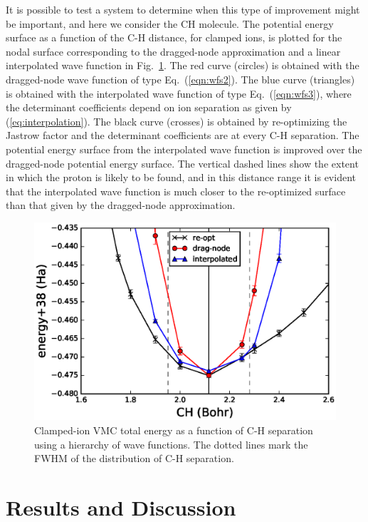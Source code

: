 \documentclass[aip,jcp,numerical,reprint]{revtex4-1}
\begin{document}
It is possible to test a system to determine when this type of improvement might be important, and here we consider the CH molecule.  The potential energy surface as a function of the C-H distance, for clamped ions,  is plotted for the nodal surface corresponding to the dragged-node approximation and a linear interpolated wave function in Fig.~\ref{fig:ch-cold}. The red curve (circles) is obtained with the dragged-node wave function of type Eq.~(\ref{eqn:wfs2}). %
  The blue curve (triangles) is obtained with the interpolated wave function of type Eq.~(\ref{eqn:wfs3}), where the determinant coefficients depend on ion separation as given by (\ref{eq:interpolation}).
The black curve  (crosses) is obtained by re-optimizing the Jastrow factor and the determinant coefficients are at every C-H separation. The potential energy surface from the interpolated wave function is improved over the dragged-node potential energy surface.  The vertical dashed lines show the extent in which the proton is likely to be found, and in this distance range it is evident that the interpolated wave function is much closer to the re-optimized surface than that given by the dragged-node approximation. 

\begin{figure}[h]
\includegraphics[scale=0.5]{CH-cold}
\caption{Clamped-ion VMC total energy as a function of C-H separation using a hierarchy of wave functions. The dotted lines mark the FWHM of the distribution of C-H separation. \label{fig:ch-cold}}
\end{figure}

\section{Results and Discussion}
\end{document}
